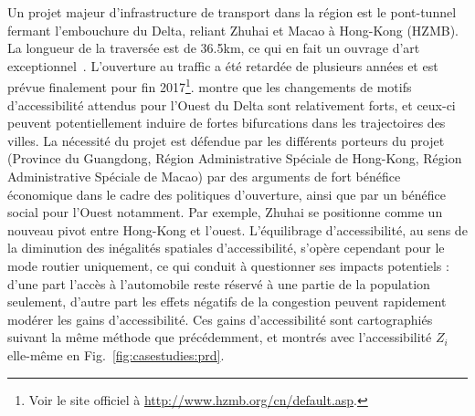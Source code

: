 Un projet majeur d'infrastructure de transport dans la région est le pont-tunnel fermant l'embouchure du Delta, reliant Zhuhai et Macao à Hong-Kong (HZMB). La longueur de la traversée est de 36.5km, ce qui en fait un ouvrage d'art exceptionnel~\cite{hussain2011hong}. L'ouverture au traffic a été retardée de plusieurs années et est prévue finalement pour fin 2017\footnote{Voir le site officiel à \url{http://www.hzmb.org/cn/default.asp}.}. \cite{zhou2016medium} montre que les changements de motifs d'accessibilité attendus pour l'Ouest du Delta sont relativement forts, et ceux-ci peuvent potentiellement induire de fortes bifurcations dans les trajectoires des villes. La nécessité du projet est défendue par les différents porteurs du projet (Province du Guangdong, Région Administrative Spéciale de Hong-Kong, Région Administrative Spéciale de Macao) par des arguments de fort bénéfice économique dans le cadre des politiques d'ouverture, ainsi que par un bénéfice social pour l'Ouest notamment. Par exemple, Zhuhai se positionne comme un nouveau pivot entre Hong-Kong et l'ouest. L'équilibrage d'accessibilité, au sens de la diminution des inégalités spatiales d'accessibilité, s'opère cependant pour le mode routier uniquement, ce qui conduit à questionner ses impacts potentiels : d'une part l'accès à l'automobile reste réservé à une partie de la population seulement, d'autre part les effets négatifs de la congestion peuvent rapidement modérer les gains d'accessibilité. Ces gains d'accessibilité sont cartographiés suivant la même méthode que précédemment, et montrés avec l'accessibilité $Z_i$ elle-même en Fig.~\ref{fig:casestudies:prd}.


